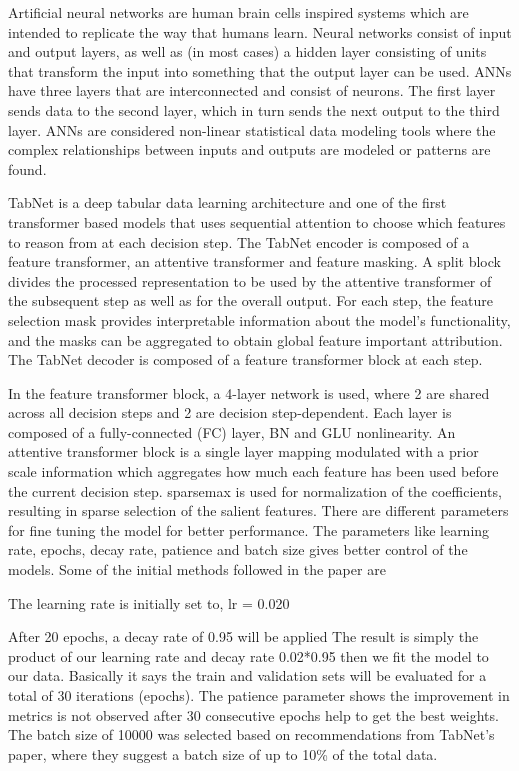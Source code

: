 \documentclass[conference,final,]{IEEEtran}
\begin{document}
Artificial neural networks are human brain cells inspired systems which
are intended to replicate the way that humans learn. Neural networks
consist of input and output layers, as well as (in most cases) a hidden
layer consisting of units that transform the input into something that
the output layer can be   used. ANNs have three layers that are interconnected
and consist of neurons. The first layer sends data to the second layer,
which in turn sends the next output to the third layer. ANNs are
considered non-linear statistical data modeling tools where the complex
relationships between inputs and outputs are modeled or patterns are
found.

TabNet is a deep tabular data learning architecture and one of the first
transformer based models that uses sequential attention to choose which
features to reason from at each decision step. The TabNet encoder is
composed of a feature transformer, an attentive transformer and feature
masking. A split block divides the processed representation to be used
by the attentive transformer of the subsequent step as well as for the
overall output. For each step, the feature selection mask provides
interpretable information about the model's functionality, and the masks
can be aggregated to obtain global feature important attribution. The
TabNet decoder is composed of a feature transformer block at each step.

In the feature transformer block, a 4-layer network is used, where 2 are
shared across all decision steps and 2 are decision step-dependent. Each
layer is composed of a fully-connected (FC) layer, BN and GLU
nonlinearity. An attentive transformer block is a single layer mapping
modulated with a prior scale information which aggregates how much each
feature has been used before the current decision step. sparsemax is
used for normalization of the coefficients, resulting in sparse
selection of the salient features. There are different parameters for
fine tuning the model for better performance. The parameters like
learning rate, epochs, decay rate, patience and batch size gives better
control of the models. Some of the initial methods followed in the paper
are

The learning rate is initially set to, lr = 0.020

After 20 epochs, a decay rate of 0.95 will be applied The result is
simply the product of our learning rate and decay rate 0.02*0.95 then we fit the model to our data. Basically it says the
train and validation sets will be evaluated for a total of 30 iterations
(epochs). The patience parameter shows the improvement in
metrics is not observed after 30 consecutive epochs help to get the best weights. The
batch size of 10000 was selected based on recommendations from TabNet's
paper, where they suggest a batch size of up to 10\% of the total data.
\end{document}
